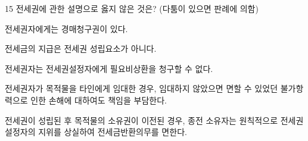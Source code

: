 \begin{question}{15}
전세권에 관한 설명으로 옳지 않은 것은? (다툼이 있으면 판례에 의함)
\begin{choices}
  \item 전세권자에게는 경매청구권이 있다.
  \item 전세금의 지급은 전세권 성립요소가 아니다.
  \item 전세권자는 전세권설정자에게 필요비상환을 청구할 수 없다.
  \item 전세권자가 목적물을 타인에게 임대한 경우, 임대하지 않았으면 면할 수 있었던 불가항력으로 인한 손해에 대하여도 책임을 부담한다.
  \item 전세권이 성립된 후 목적물의 소유권이 이전된 경우, 종전 소유자는 원칙적으로 전세권설정자의 지위를 상실하여 전세금반환의무를 면한다.
\end{choices}
\end{question}

